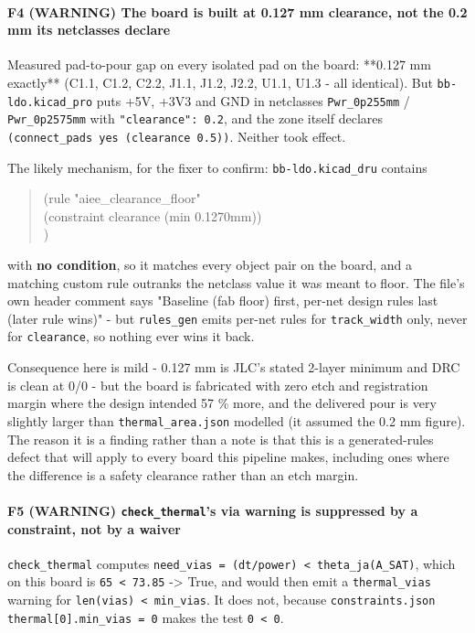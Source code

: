 \documentclass[11pt,a4paper]{article}
\begin{document}
\paragraph*{F4 (WARNING) The board is built at 0.127 mm clearance, not the 0.2 mm its netclasses declare}
Measured pad-to-pour gap on every isolated pad on the board: {*}{*}0.127 mm exactly{*}{*} (C1.1, C1.2, C2.2, J1.1, J1.2, J2.2, U1.1, U1.3 - all identical). But \texttt{bb-ldo.kicad\_pro} puts +5V, +3V3 and GND in netclasses \texttt{Pwr\_0p255mm} / \texttt{Pwr\_0p2575mm} with \texttt{"clearance": 0.2}, and the zone itself declares \texttt{(connect\_pads yes (clearance 0.5))}. Neither took effect.

The likely mechanism, for the fixer to confirm: \texttt{bb-ldo.kicad\_dru} contains

\begin{quote}\small\ttfamily\raggedright
(rule "aiee\_clearance\_floor"\\
	(constraint clearance (min 0.1270mm))\\
)
\end{quote}
with \textbf{no condition}, so it matches every object pair on the board, and a matching custom rule outranks the netclass value it was meant to floor. The file's own header comment says "Baseline (fab floor) first, per-net design rules last (later rule wins)" - but \texttt{rules\_gen} emits per-net rules for \texttt{track\_width} only, never for \texttt{clearance}, so nothing ever wins it back.

Consequence here is mild - 0.127 mm is JLC's stated 2-layer minimum and DRC is clean at 0/0 - but the board is fabricated with zero etch and registration margin where the design intended 57 \% more, and the delivered pour is very slightly larger than \texttt{thermal\_area.json} modelled (it assumed the 0.2 mm figure). The reason it is a finding rather than a note is that this is a generated-rules defect that will apply to every board this pipeline makes, including ones where the difference is a safety clearance rather than an etch margin.

\paragraph*{F5 (WARNING) \texttt{check\_thermal}'s via warning is suppressed by a constraint, not by a waiver}
\texttt{check\_thermal} computes \texttt{need\_vias = (dt/power) \textless{} theta\_ja(A\_SAT)}, which on this board is \texttt{65 \textless{} 73.85} -\textgreater{} True, and would then emit a \texttt{thermal\_vias} warning for \texttt{len(vias) \textless{} min\_vias}. It does not, because \texttt{constraints.json thermal{[}0{]}.min\_vias = 0} makes the test \texttt{0 \textless{} 0}.
\end{document}
